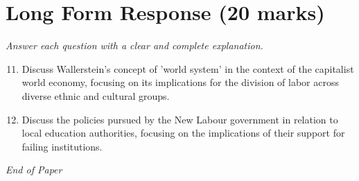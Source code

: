 \documentclass[12pt]{article}
\begin{document}
\section*{Long Form Response (20 marks)}
\textit{Answer each question with a clear and complete explanation.}
\begin{enumerate}[label=\arabic*.]
\setcounter{enumi}{10}
\item Discuss Wallerstein's concept of 'world system' in the context of the capitalist world economy, focusing on its implications for the division of labor across diverse ethnic and cultural groups.
\item Discuss the policies pursued by the New Labour government in relation to local education authorities, focusing on the implications of their support for failing institutions.
\end{enumerate}

\vfill
\noindent\textit{End of Paper}
\end{document}
